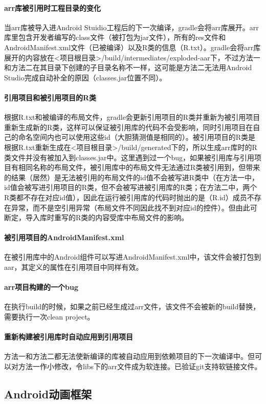 \documentclass[UTF8]{ctexart}
\begin{document}
    \paragraph{arr库被引用时工程目录的变化}
    当arr库被导入进Android Stuidio工程后的下一次编译，gradle会将arr库展开。arr库里包含开发者编写的class文件（被打包为jar文件），所有的res文件和AndroidManifest.xml文件（已被编译）以及R类的信息（R.txt）。gradle会将arr库展开的内容放在<项目根目录>/build/intermediates/exploded-aar下，不过方法一和方法二在其目录下创建的子目录名称不一样，这可能是方法二无法用Android Studio完成自动补全的原因（classes.jar位置不同）。
    \paragraph{引用项目和被引用项目的R类}
    根据R.txt和被编译的布局文件，gradle会更新引用项目的R类并重新为被引用项目重新生成新的R类，这样可以保证被引用库的代码不会受影响，同时引用项目在自己的命名空间内也可以使用这些id（大胆猜测值是相同的）。被引用项目的R类是根据R.txt重新生成在<项目根目录>/build/generated下的，所以生成arr库时的R类文件并没有被加入到classes.jar中。这里遇到过一个bug，如果被引用库与引用项目有相同名称的布局文件，被引用库中的布局文件无法通过R类被引用到，但带来的结果（居然）是无法被引用的布局文件的id值不会被写进R类中（在方法一中，id值会被写进引用项目的R类，但不会被写进被引用库的R类；在方法二中，两个R类都不存在对应id值），因此在运行被引用库的代码时抛出的是（R.id）成员不存在异常，而不是空引用异常（布局文件不同因此找不到对应id的控件）。但由此可断定，导入库时重写的R类的内容受库中布局文件的影响。
    \paragraph{被引用项目的AndroidManifest.xml}
    在被引用库中的Android组件可以写进AndroidManifest.xml中，该文件会被打包到aar，其定义的属性在引用项目中同样有效。
    \paragraph{arr项目构建的一个bug}
    在执行build的时候，如果之前已经生成过arr文件，该文件不会被新的build替换，需要执行一次clean project。
    \paragraph{重新构建被引用库时自动应用到引用项目}
    方法一和方法二都无法使新编译的库被自动应用到依赖项目的下一次编译中。但可以对方法一作小修改，令libs下的arr文件成为软连接。已验证git支持软链接文件。
    \subsection{Android动画框架}
\end{document}
